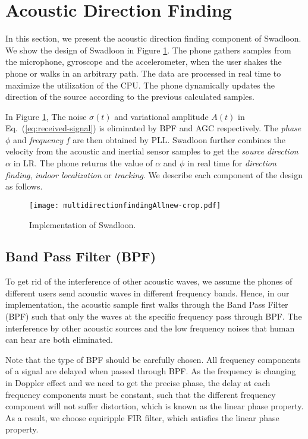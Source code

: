 \documentclass[]{sig-alternate-10pt}
\newcommand{\eqqref}[1]{Eq.~(\ref{#1})}
\def \ourprotocol{Swadloon\xspace}
\begin{document}
\section{Acoustic Direction Finding}
\label{sec:directionfinding}


In this section, we present the acoustic direction finding component
 of \ourprotocol.
We show the design of \ourprotocol in Figure
\ref{fig:Calculating-the-direction}.  The phone gathers samples from the
microphone, gyroscope and the accelerometer, when the user shakes
the phone or walks in an arbitrary path. The data are processed in real time to
maximize the utilization of the CPU. The phone dynamically updates the
direction of the source according to the previous calculated samples.

In Figure \ref{fig:Calculating-the-direction}, The noise $\sigma(t)$ and variational amplitude $A(t)$
in \eqqref{eq:received-signal} is eliminated by BPF and AGC
respectively. The \textit{phase} $\phi$ and \textit{frequency} $f$ are then
obtained by PLL. \ourprotocol further combines the velocity from the acoustic and
inertial sensor samples to get the \textit{source direction} $\alpha$ in LR.
The phone  returns the value of $\alpha$  and $\phi$ in real time for
\textit{direction finding}, \textit{indoor localization} or \textit{tracking}.  We describe each
component of the design as follows.
\begin{figure}[h]
\begin{centering}
\texttt{[image: multidirectionfindingAllnew-crop.pdf]}
\par\end{centering}
\caption{Implementation of \ourprotocol.}
\label{fig:Calculating-the-direction}
\end{figure}

\subsection{Band Pass Filter (BPF)}
To get rid of the interference of other acoustic waves, we assume
the phones of different users send acoustic waves in different frequency bands.
Hence, in our implementation, the acoustic sample first walks through
the Band Pass Filter (BPF) such that only the waves at the specific
frequency pass through BPF. The interference by other acoustic sources
and the low frequency noises that human can hear are both eliminated.

Note that the type of BPF should be carefully
chosen. All frequency components of a signal are delayed when passed
through BPF. As the frequency is changing in Doppler effect and we
need to get the precise phase, the delay at each frequency components
must be constant, such that the different frequency component will not
suffer distortion, which is known as the linear phase property. As
a result, we choose equiripple FIR filter, which
satisfies the linear phase property.
\end{document}

